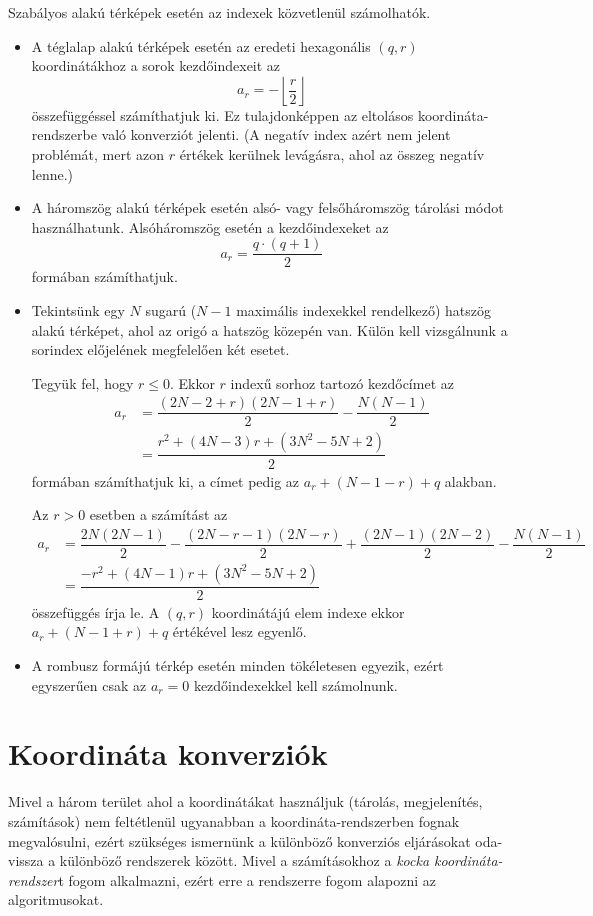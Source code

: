 Szabályos alakú térképek esetén az indexek közvetlenül számolhatók.
\begin{itemize}
\item A téglalap alakú térképek esetén az eredeti hexagonális $(q, r)$ koordinátákhoz a sorok kezdőindexeit az
$$
a_r = - \left\lfloor \dfrac{r}{2} \right\rfloor
$$
összefüggéssel számíthatjuk ki. Ez tulajdonképpen az eltolásos koordináta-rend\-szer\-be való konverziót jelenti. (A negatív index azért nem jelent problémát, mert azon $r$ értékek kerülnek levágásra, ahol az összeg negatív lenne.)
\item A háromszög alakú térképek esetén alsó- vagy felsőháromszög tárolási módot használhatunk. Alsóháromszög esetén a kezdőindexeket az
$$
a_r = \dfrac{q \cdot (q + 1)}{2}
$$
formában számíthatjuk.
\item Tekintsünk egy $N$ sugarú ($N - 1$ maximális indexekkel rendelkező) hatszög alakú térképet, ahol az origó a hatszög közepén van. Külön kell vizsgálnunk a sorindex előjelének megfelelően két esetet.

Tegyük fel, hogy $r \leq 0$. Ekkor $r$ indexű sorhoz tartozó kezdőcímet az
\begin{align*}
a_r &=
\dfrac{
(2N - 2 + r)(2N - 1 + r)
}{2}
-
\dfrac{
N(N - 1)
}{2} \\
&=
\dfrac{r^2 + (4N - 3)r + (3N^2 - 5N + 2)}{2}
\end{align*}
formában számíthatjuk ki, a címet pedig az $a_r + (N - 1 -r) + q$ alakban.

Az $r > 0$ esetben a számítást az
\begin{align*}
a_r &=
\dfrac{2N(2N - 1)}{2} -
\dfrac{(2N - r - 1)(2N - r)}{2} +
\dfrac{(2N - 1)(2N - 2)}{2} -
\dfrac{N(N - 1)}{2} \\
&=
\dfrac{-r^2 + (4N - 1)r + (3N^2 - 5N + 2)}
{2}
\end{align*}
összefüggés írja le. A $(q, r)$ koordinátájú elem indexe ekkor $a_r + (N - 1 + r) + q$ értékével lesz egyenlő.
\item A rombusz formájú térkép esetén minden tökéletesen egyezik, ezért egyszerűen csak az $a_r = 0$ kezdőindexekkel kell számolnunk.
\end{itemize}

\section{Koordináta konverziók}

Mivel a három terület ahol a koordinátákat használjuk (tárolás, megjelenítés, számítások) nem feltétlenül ugyanabban a koordináta-rendszerben fognak megvalósulni, ezért szükséges ismernünk a különböző konverziós eljárásokat oda-vissza a különböző rendszerek között. Mivel a számításokhoz a \textit{kocka koordináta-rendszer}t fogom alkalmazni, ezért erre a rendszerre fogom alapozni az algoritmusokat.

